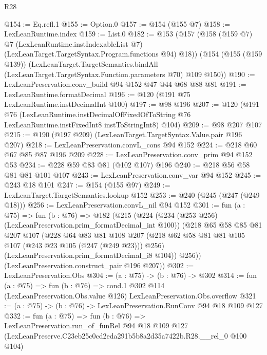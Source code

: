 \begin{lexlean}{R28}
\begin{coremodule}
@154 := Eq.refl.{1}
@155 := Option.{0}
@157 := @154 (@155 @7)
@158 := LexLeanRuntime.index
@159 := List.{0}
@182 := @153
    (@157
      (@158
        (@159 @7)
        @7
        (LexLeanRuntime.instIndexableList @7)
        (LexLeanTarget.TargetSyntax.Program.functions @94)
        @18))
    (@154
      (@155 (@159 @139))
      (LexLeanTarget.TargetSemantics.bindAll
        (LexLeanTarget.TargetSyntax.Function.parameters @70)
        @109
        @150))
@190 := LexLeanPreservation.conv_build @94 @152 @47 @44 @68 @88 @81
@191 := LexLeanRuntime.formatDecimal
@196 := @120 (@191 @75 LexLeanRuntime.instDecimalInt @100)
@197 := @98 @196
@207 := @120
    (@191
      @76
      (LexLeanRuntime.instDecimalOfFixedOfToString
        @76
        LexLeanRuntime.instFixedInt8
        instToStringInt8)
      @104)
@209 := @98 @207 @107
@215 := @190 (@197 @209) (LexLeanTarget.TargetSyntax.Value.pair @196 @207)
@218 := LexLeanPreservation.convL_cons @94 @152
@224 := @218 @60 @67 @85 @87 @196 @209
@228 := LexLeanPreservation.conv_prim @94 @152 @53
@234 := @228 @59 @83 @81 (@102 @107) @196
@240 := @218 @56 @58 @81 @81 @101 @107
@243 := LexLeanPreservation.conv_var @94 @152
@245 := @243 @18 @101
@247 := @154 (@155 @97)
@249 := LexLeanTarget.TargetSemantics.lookup @152
@253 := @240 (@245 (@247 (@249 @18)))
@256 := LexLeanPreservation.convL_nil @94 @152
@301 := fun (a : @75) =>
  fun (b : @76) =>
  @182
    (@215
      (@224
        (@234 (@253 @256) (LexLeanPreservation.prim_formatDecimal_int @100))
        (@218
          @65
          @58
          @85
          @81
          @207
          @107
          (@228
            @64
            @83
            @81
            @108
            @207
            (@218 @62 @58 @81 @81 @105 @107 (@243 @23 @105 (@247 (@249 @23))) @256)
            (LexLeanPreservation.prim_formatDecimal_i8 @104))
          @256))
      (LexLeanPreservation.construct_pair @196 @207))
@302 := LexLeanPreservation.Obs
@304 := (a : @75) -> (b : @76) -> @302
@314 := fun (a : @75) =>
  fun (b : @76) =>
  cond.{1} @302 @114 (LexLeanPreservation.Obs.value @126) LexLeanPreservation.Obs.overflow
@321 := (a : @75) -> (b : @76) -> LexLeanPreservation.RunConv @94 @18 @109 @127
@332 := fun (a : @75) =>
  fun (b : @76) =>
  LexLeanPreservation.run_of_funRel
    @94
    @18
    @109
    @127
    (LexLeanPreserve.C23eb25c0cd2eda291b5b8a2d35a7422b.R28.__rel_0 @100 @104)
\end{coremodule}
\end{lexlean}
